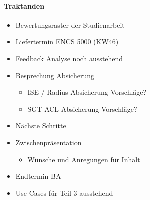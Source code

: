 \paragraph{Traktanden}
\begin{itemize}	
	\item Bewertungsraster der Studienarbeit
	\item Liefertermin ENCS 5000 (KW46)
	\item Feedback Analyse noch ausstehend
	\item Besprechung Absicherung
	\begin{itemize}
		\item ISE / Radius Absicherung Vorschläge?
		\item SGT ACL Absicherung Vorschläge?
	\end{itemize}
	\item Nächste Schritte
	\item Zwischenpräsentation 
	\begin{itemize}
		\item Wünsche und Anregungen für Inhalt
	\end{itemize}
	\item Endtermin BA
	\item Use Cases für Teil 3 ausstehend
\end{itemize}

